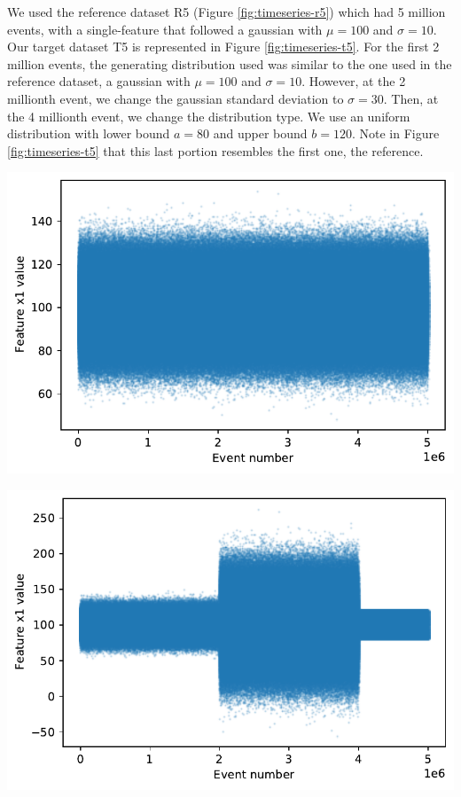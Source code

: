 We used the reference dataset R5 (Figure \ref{fig:timeseries-r5}) which had 5 million events, with a single-feature that followed a gaussian with  $\mu=100$ and $\sigma=10$. Our target dataset T5 is represented in Figure \ref{fig:timeseries-t5}. For the first 2 million events, the generating distribution used was similar to the one used in the reference dataset, a gaussian with $\mu=100$ and $\sigma=10$. However, at the 2 millionth event, we change the gaussian standard deviation to $\sigma=30$. Then, at the 4 millionth event, we change the distribution type. We use an uniform distribution with lower bound $a=80$ and upper bound $b=120$. Note in Figure \ref{fig:timeseries-t5} that this last portion resembles the first one, the reference.
\begin{center}
\begin{minipage}{.5\textwidth}
  \centering
  \includegraphics[width=1\linewidth]{figures/timeseries-r5.pdf}
  \label{fig:timeseries-r5}
\end{minipage}%
\begin{minipage}{.5\textwidth}
  \centering
  \includegraphics[width=1\linewidth]{figures/timeseries-t5.pdf}
  \label{fig:timeseries-t5}
\end{minipage}
\end{center}

